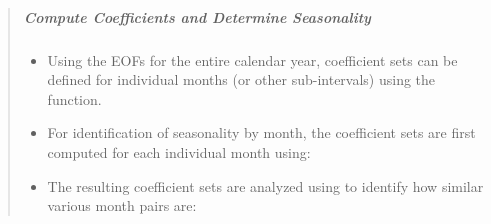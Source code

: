 \documentclass[letterpaper,10pt,english]{sphinxmanual}
\begin{document}
\begin{itemize}
\begin{quote}
\subparagraph{Compute Coefficients and Determine Seasonality}
\label{\detokenize{eofs:compute-coefficients-and-determine-seasonality}}\begin{itemize}
\item {} 
Using the EOFs for the entire calendar year, coefficient sets can be defined for individual months (or other sub-intervals) using the  function.

\item {} 
For identification of seasonality by month, the coefficient sets are first computed for each individual month using:

\end{itemize}

\begin{sphinxVerbatim}[commandchars=\\\{\}]
  \PYG{p}{[}\PYG{p}{]}  
    
        
    \PYG{p}{[}  \PYG{p}{]}      
\end{sphinxVerbatim}
\begin{itemize}
\item {} 
The resulting coefficient sets are analyzed using  to identify how similar various month pairs are:

\end{itemize}


\end{quote}
\end{itemize}
\end{document}
